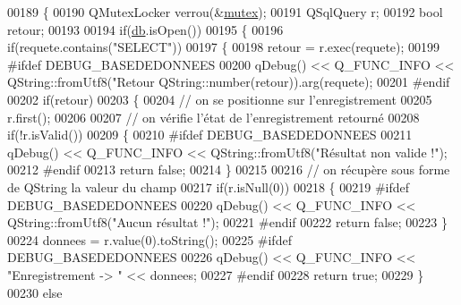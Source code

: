 \begin{DoxyCode}
00189 \{
00190     QMutexLocker verrou(&\hyperlink{class_base_de_donnees_aa1b4696fac87a740f914aa73739086f2}{mutex});
00191     QSqlQuery r;
00192     \textcolor{keywordtype}{bool} retour;
00193 
00194     \textcolor{keywordflow}{if}(\hyperlink{class_base_de_donnees_a3e738dcf443370c46a541677ab619f06}{db}.isOpen())
00195     \{
00196         \textcolor{keywordflow}{if}(requete.contains(\textcolor{stringliteral}{"SELECT"}))
00197         \{
00198             retour = r.exec(requete);
00199 \textcolor{preprocessor}{            #ifdef DEBUG\_BASEDEDONNEES}
00200             qDebug() << Q\_FUNC\_INFO << QString::fromUtf8(\textcolor{stringliteral}{"Retour %
      QString::number(retour)).arg(requete);
00201 \textcolor{preprocessor}{            #endif}
00202             \textcolor{keywordflow}{if}(retour)
00203             \{
00204                 \textcolor{comment}{// on se positionne sur l'enregistrement}
00205                 r.first();
00206 
00207                 \textcolor{comment}{// on vérifie l'état de l'enregistrement retourné}
00208                 \textcolor{keywordflow}{if}(!r.isValid())
00209                 \{
00210 \textcolor{preprocessor}{                    #ifdef DEBUG\_BASEDEDONNEES}
00211                     qDebug() << Q\_FUNC\_INFO << QString::fromUtf8(\textcolor{stringliteral}{"Résultat non valide !"});
00212 \textcolor{preprocessor}{                    #endif}
00213                     \textcolor{keywordflow}{return} \textcolor{keyword}{false};
00214                 \}
00215 
00216                 \textcolor{comment}{// on récupère sous forme de QString la valeur du champ}
00217                 \textcolor{keywordflow}{if}(r.isNull(0))
00218                 \{
00219 \textcolor{preprocessor}{                    #ifdef DEBUG\_BASEDEDONNEES}
00220                     qDebug() << Q\_FUNC\_INFO << QString::fromUtf8(\textcolor{stringliteral}{"Aucun résultat !"});
00221 \textcolor{preprocessor}{                    #endif}
00222                     \textcolor{keywordflow}{return} \textcolor{keyword}{false};
00223                 \}
00224                 donnees = r.value(0).toString();
00225 \textcolor{preprocessor}{                #ifdef DEBUG\_BASEDEDONNEES}
00226                 qDebug() << Q\_FUNC\_INFO << \textcolor{stringliteral}{"Enregistrement -> "} << donnees;
00227 \textcolor{preprocessor}{                #endif}
00228                 \textcolor{keywordflow}{return} \textcolor{keyword}{true};
00229             \}
00230             \textcolor{keywordflow}{else}
}
\end{DoxyCode}

